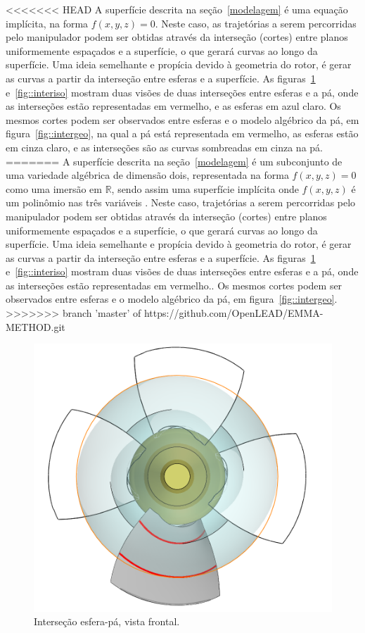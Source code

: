 <<<<<<< HEAD
A superfície descrita na seção~\ref{modelagem} é uma equação implícita, na forma
$f(x,y,z)=0$. Neste caso, as trajetórias a serem percorridas pelo manipulador
podem ser obtidas através da interseção (cortes) entre planos uniformemente
espaçados e a superfície, o que gerará curvas ao longo da superfície. Uma ideia
semelhante e propícia devido à geometria do rotor, é gerar as curvas a partir da interseção
entre esferas e a superfície. As figuras~\ref{fig::interfrontal}
e~\ref{fig::interiso} mostram duas visões de duas interseções entre esferas e
a pá, onde as interseções estão representadas em vermelho, e as esferas em
azul claro. Os mesmos cortes podem ser observados entre esferas e o modelo
algébrico da pá, em figura~\ref{fig::intergeo}, na qual a pá está representada
em vermelho, as esferas estão em cinza claro, e as interseções são as curvas
sombreadas em cinza na pá.
=======
A superfície descrita na seção~\ref{modelagem} é um subconjunto de uma
variedade algébrica de dimensão dois, representada na forma $f(x,y,z)=0$ como
uma imersão em $\mathbb{R}$, sendo assim uma superfície implícita onde
$f(x,y,z)$ é um polinômio nas três variáveis .
Neste caso, trajetórias a serem percorridas pelo manipulador podem ser obtidas através da interseção (cortes)
entre planos uniformemente espaçados e a superfície, o que gerará curvas ao
longo da superfície. Uma ideia semelhante e propícia devido à geometria do
rotor, é gerar as curvas a partir da interseção entre esferas e a superfície. As
figuras~\ref{fig::interfrontal} e~\ref{fig::interiso} mostram duas visões de
duas interseções entre esferas e a pá, onde as interseções estão representadas
em vermelho.. Os mesmos cortes podem ser observados entre esferas e o modelo
algébrico da pá, em figura~\ref{fig::intergeo}.
>>>>>>> branch 'master' of https://github.com/OpenLEAD/EMMA-METHOD.git


\begin{figure}[!ht]
	\centering
	\includegraphics[width=.7\columnwidth]{figs/planejamento/intersecao_frontal.PNG}
	\caption{Interseção esfera-pá, vista frontal.}
	\label{fig::interfrontal}
\end{figure}

